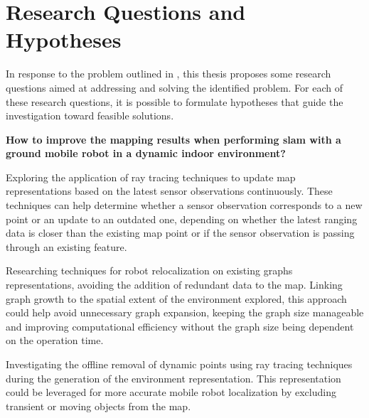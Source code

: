 \section{Research Questions and Hypotheses}\label{sec:intro:rq+h}

In response to the problem outlined in ,
this thesis proposes some research questions aimed at addressing and solving
the identified problem. For each of these research questions, it is possible to
formulate hypotheses that guide the investigation toward feasible solutions.

\begin{question}\label{question:mapping}
\textbf{How to improve the mapping results when performing \gls{slam} with a
ground mobile robot in a dynamic indoor environment?}
\end{question}


\begin{hypothesis}\label{hypothesis:mapping:ray-tracing}
Exploring the application of ray tracing techniques to update map
representations based on the latest sensor observations continuously.
These techniques can help determine whether a sensor observation corresponds
to a new point or an update to an outdated one,
depending on whether the latest ranging data is closer than the existing map
point or if the sensor observation is passing through an existing feature.
\end{hypothesis}

\begin{hypothesis}\label{hypothesis:mapping:relocalization}
Researching techniques for robot relocalization on existing graphs
representations, avoiding the addition of redundant data to the map.
Linking graph growth to the spatial extent of the environment explored,
this approach could help avoid unnecessary graph expansion,
keeping the graph size manageable and improving computational efficiency
without the graph size being dependent on the operation time.
\end{hypothesis}

\begin{hypothesis}\label{hypothesis:mapping:clean-map}
Investigating the offline removal of dynamic points using ray tracing techniques
during the generation of the environment representation.
This representation could be leveraged for more accurate mobile robot
localization by excluding transient or moving objects from the map.
\end{hypothesis}

